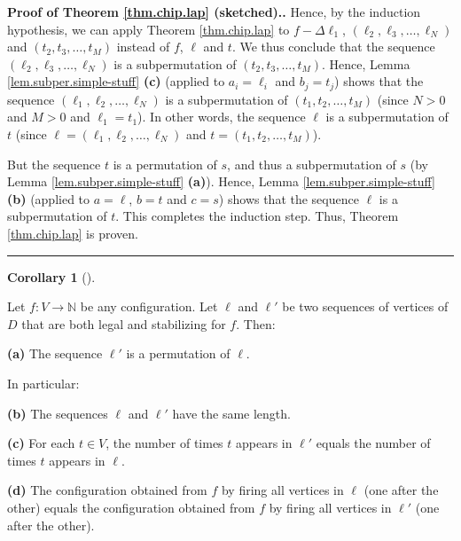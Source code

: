 \documentclass[numbers=enddot,12pt,final,onecolumn,notitlepage]{scrartcl}%
\theoremstyle{definition}
\newtheorem{coro}[theo]{Corollary}
\newenvironment{corollary}[1][]
{\begin{coro}[#1]\begin{leftbar}}
{\end{leftbar}\end{coro}}
\newenvironment{proof}[1][Proof]{\noindent\textbf{#1.} }{\ \rule{0.5em}{0.5em}}
\newcommand{\NN}{\mathbb{N}}
\begin{document}
\begin{proof}[Proof of Theorem \ref{thm.chip.lap} (sketched).]
Hence, by the induction hypothesis, we can apply Theorem \ref{thm.chip.lap} to
$f-\Delta\ell_{1}$, $\left(  \ell_{2},\ell_{3},\ldots,\ell_{N}\right)  $ and
$\left(  t_{2},t_{3},\ldots,t_{M}\right)  $ instead of $f$, $\ell$ and $t$. We
thus conclude that the sequence $\left(  \ell_{2},\ell_{3},\ldots,\ell
_{N}\right)  $ is a subpermutation of $\left(  t_{2},t_{3},\ldots
,t_{M}\right)  $. Hence, Lemma \ref{lem.subper.simple-stuff} \textbf{(c)}
(applied to $a_{i}=\ell_{i}$ and $b_{j}=t_{j}$) shows that the sequence
$\left(  \ell_{1},\ell_{2},\ldots,\ell_{N}\right)  $ is a subpermutation of
$\left(  t_{1},t_{2},\ldots,t_{M}\right)  $ (since $N>0$ and $M>0$ and
$\ell_{1}=t_{1}$). In other words, the sequence $\ell$ is a subpermutation of
$t$ (since $\ell=\left(  \ell_{1},\ell_{2},\ldots,\ell_{N}\right)  $ and
$t=\left(  t_{1},t_{2},\ldots,t_{M}\right)  $).

But the sequence $t$ is a permutation of $s$, and thus a subpermutation of $s$
(by Lemma \ref{lem.subper.simple-stuff} \textbf{(a)}). Hence, Lemma
\ref{lem.subper.simple-stuff} \textbf{(b)} (applied to $a=\ell$, $b=t$ and
$c=s$) shows that the sequence $\ell$ is a subpermutation of $t$. This
completes the induction step. Thus, Theorem \ref{thm.chip.lap} is proven.
\end{proof}

\begin{corollary} \label{cor.chip.lap-cor}
Let $f : V \to \NN$ be any configuration.
Let $\ell$ and $\ell'$ be two sequences of vertices of $D$
that are both legal and stabilizing for $f$.
Then:

\textbf{(a)} The sequence $\ell'$ is a permutation of $\ell$.

In particular:

\textbf{(b)} The sequences $\ell$ and $\ell'$ have the
same length.

\textbf{(c)} For each $t \in V$, the number of times $t$
appears in $\ell'$ equals the number of times $t$ appears in
$\ell$.

\textbf{(d)} The configuration obtained from $f$ by firing
all vertices in $\ell$ (one after the other) equals the
configuration obtained from $f$ by firing
all vertices in $\ell'$ (one after the other).
\end{corollary}
\end{document}
